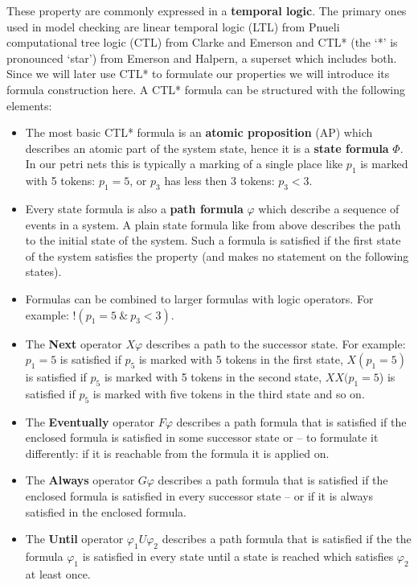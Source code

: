 These property are commonly expressed in a \textbf{temporal logic}.
The primary ones used in model checking are linear temporal logic (LTL) from Pnueli\cite{pnueli1977temporal} computational tree logic (CTL) from Clarke and Emerson\cite{clarke1981design} and CTL* (the `*' is pronounced `star') from Emerson and Halpern\cite{emerson1985decision}, a superset which includes both.
Since we will later use CTL* to formulate our properties we will introduce its formula construction here.
A CTL* formula can be structured with the following elements:
\begin{itemize}
  \item The most basic CTL* formula is an \textbf{atomic proposition} (AP) which describes an atomic part of the system state, hence it is a \textbf{state formula} $\Phi$. 
  In our petri nets this is typically a marking of a single place like $p_1$ is marked with 5 tokens: $p_1=5$, or $p_3$ has less then 3 tokens: $p_3<3$.
  \item Every state formula is also a \textbf{path formula} $\varphi$ which describe a sequence of events in a system.
  A plain state formula like from above describes the path to the initial state of the system. Such a formula is satisfied if the first state of the system satisfies the property (and makes no statement on the following states).
  \item Formulas can be combined to larger formulas with logic operators. For example: $!(p_1=5\ \&\ p_3<3)$.
  \item The \textbf{Next} operator $X\varphi$ describes a path to the successor state. For example: $p_1=5$ is satisfied if $p_5$ is marked with 5 tokens in the first state, $X(p_1=5)$ is satisfied if $p_5$ is marked with 5 tokens in the second state, $XX(p_1=5$) is satisfied if $p_5$ is marked with five tokens in the third state and so on.
  \item The \textbf{Eventually} operator $F\varphi$ describes a path formula that is satisfied if the enclosed formula is satisfied in some successor state or -- to formulate it differently: if it is reachable from the formula it is applied on.
  \item The \textbf{Always} operator $G\varphi$ describes a path formula that is satisfied if the enclosed formula is satisfied in every successor state -- or if it is always satisfied in the enclosed formula.
  \item The \textbf{Until} operator $\varphi_1 U\varphi_2$ describes a path formula that is satisfied if the the formula $\varphi_1$ is satisfied in every state until a state is reached which satisfies $\varphi_2$ at least once.

\end{itemize}

